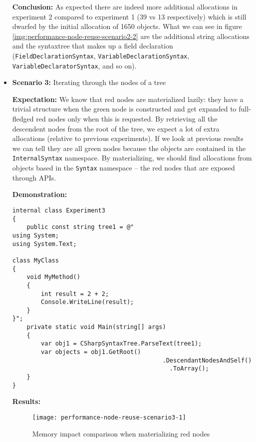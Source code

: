 \begin{itemize}
\textbf{Conclusion:} As expected there are indeed more additional allocations in experiment 2 compared to experiment 1 (39 vs 13 respectively) which is still dwarfed by the initial allocation of 1650 objects. What we can see in figure \ref{img:performance-node-reuse-scenario2-2} are the additional string allocations and the \gls{syntaxtree} that makes up a field declaration (\texttt{FieldDeclarationSyntax}, \texttt{VariableDeclarationSyntax}, \texttt{VariableDeclaratorSyntax}, and so on).

\newpage

\item \textbf{Scenario 3:} Iterating through the nodes of a tree

\textbf{Expectation:} We know that red nodes are materialized lazily: they have a trivial structure when the green node is constructed and get expanded to full-fledged red nodes only when this is requested. By retrieving all the descendent nodes from the root of the tree, we expect a lot of extra allocations (relative to previous experiments). If we look at previous results we can tell they are all green nodes because the objects are contained in the \texttt{InternalSyntax} namespace. By materializing, we should find allocations from objects based in the \texttt{Syntax} namespace -- the red nodes that are exposed through APIs.

\textbf{Demonstration:}

\begin{lstlisting}
internal class Experiment3
{
    public const string tree1 = @"
using System;
using System.Text;

class MyClass 
{
    void MyMethod()
    {
        int result = 2 + 2;
        Console.WriteLine(result);
    }
}";
    private static void Main(string[] args)
	{
		var obj1 = CSharpSyntaxTree.ParseText(tree1);
		var objects = obj1.GetRoot()
										  .DescendantNodesAndSelf()
											.ToArray();
	}
}
\end{lstlisting}

\begin{minipage}{\linewidth}
\textbf{Results:}

\begin{figure}[H]
\centering
\texttt{[image: performance-node-reuse-scenario3-1]}
\caption{Memory impact comparison when materializing red nodes}
\label{img:performance-node-reuse-scenario3-1}
\end{figure}


\end{minipage}
\end{itemize}
